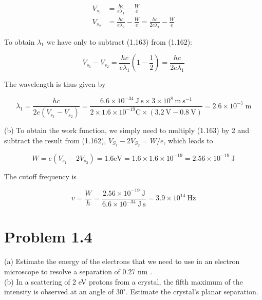 \documentclass[10pt]{article}
\begin{document}
\begin{align*}
V_{s_{1}} & =\frac{h c}{e \lambda_{1}}-\frac{W}{e}  \tag{1.162}\\
V_{s_{2}} & =\frac{h c}{e \lambda_{2}}-\frac{W}{e}=\frac{h c}{2 e \lambda_{1}}-\frac{W}{e} \tag{1.163}
\end{align*}


To obtain $\lambda_{1}$ we have only to subtract (1.163) from (1.162):


\begin{equation*}
V_{s_{1}}-V_{s_{2}}=\frac{h c}{e \lambda_{1}}\left(1-\frac{1}{2}\right)=\frac{h c}{2 e \lambda_{1}} \tag{1.164}
\end{equation*}


The wavelength is thus given by


\begin{equation*}
\lambda_{1}=\frac{h c}{2 e\left(V_{s_{1}}-V_{s_{2}}\right)}=\frac{6.6 \times 10^{-34} \mathrm{~J} \mathrm{~s} \times 3 \times 10^{8} \mathrm{~m} \mathrm{~s}^{-1}}{2 \times 1.6 \times 10^{-19} \mathrm{C} \times(3.2 \mathrm{~V}-0.8 \mathrm{~V})}=2.6 \times 10^{-7} \mathrm{~m} \tag{1.165}
\end{equation*}


(b) To obtain the work function, we simply need to multiply (1.163) by 2 and subtract the result from (1.162), $V_{S_{1}}-2 V_{S_{2}}=W / e$, which leads to


\begin{equation*}
W=e\left(V_{s_{1}}-2 V_{s_{2}}\right)=1.6 \mathrm{eV}=1.6 \times 1.6 \times 10^{-19}=2.56 \times 10^{-19} \mathrm{~J} \tag{1.166}
\end{equation*}


The cutoff frequency is


\begin{equation*}
v=\frac{W}{h}=\frac{2.56 \times 10^{-19} \mathrm{~J}}{6.6 \times 10^{-34} \mathrm{~J} \mathrm{~s}}=3.9 \times 10^{14} \mathrm{~Hz} \tag{1.167}
\end{equation*}


\section*{Problem 1.4}
(a) Estimate the energy of the electrons that we need to use in an electron microscope to resolve a separation of 0.27 nm .\\
(b) In a scattering of 2 eV protons from a crystal, the fifth maximum of the intensity is observed at an angle of $30^{\circ}$. Estimate the crystal's planar separation.
\end{document}
